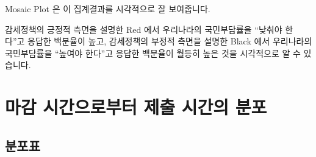 \documentclass[
]{book}
\begin{document}
Mosaic Plot 은 이 집계결과를 시각적으로 잘 보여줍니다.

감세정책의 긍정적 측면을 설명한 Red 에서 우리나라의 국민부담률을 ``낮춰야 한다''고 응답한 백분율이 높고, 감세정책의 부정적 측면을 설명한 Black 에서 우리나라의 국민부담률을 ``높여야 한다''고 응답한 백분율이 월등히 높은 것을 시각적으로 알 수 있습니다.

\section{마감 시간으로부터 제출 시간의 분포}\label{uxb9c8uxac10-uxc2dcuxac04uxc73cuxb85cuxbd80uxd130-uxc81cuxcd9c-uxc2dcuxac04uxc758-uxbd84uxd3ec-2}

\subsection{분포표}\label{uxbd84uxd3ecuxd45c-3}
\end{document}
